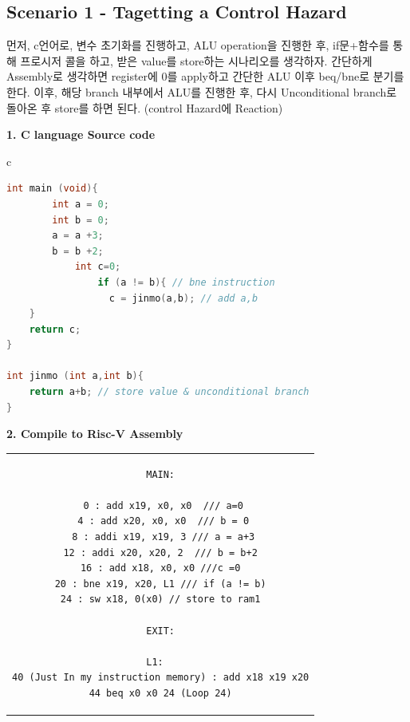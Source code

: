 \documentclass[oneside]{article}
\begin{document}
\subsection{Scenario 1 - Tagetting a Control Hazard}

먼저, c언어로, 변수 초기화를 진행하고, ALU operation을 진행한 후, if문+함수를 통해 프로시저 콜을 하고, 받은 value를 store하는 시나리오를 생각하자. 간단하게 Assembly로 생각하면 register에 0를 apply하고 간단한 ALU 이후 beq/bne로 분기를 한다. 이후, 해당 branch 내부에서 ALU를 진행한 후, 다시 Unconditional branch로 돌아온 후 store를 하면 된다.  (control Hazard에 Reaction)

\begin{center}
\textbf{1. C language Source code}
\end{center}
\begin{center}
\begin{tabular}{c}
\begin{lstlisting}[language=C]
int main (void){
        int a = 0;
        int b = 0;
        a = a +3;
        b = b +2;
            int c=0;
                if (a != b){ // bne instruction
                  c = jinmo(a,b); // add a,b
    }
    return c;
}

int jinmo (int a,int b){
    return a+b; // store value & unconditional branch
}
\end{lstlisting}
\end{tabular}
\end{center}

\begin{center}

\end{center}

\begin{center}
\textbf{2. Compile to Risc-V Assembly }
\end{center}

\begin{center}
\begin{tabular}{c}
\begin{lstlisting}[language={[RISC-V]Assembler}]
MAIN:

 0 : add x19, x0, x0  /// a=0
 4 : add x20, x0, x0  /// b = 0
 8 : addi x19, x19, 3 /// a = a+3
12 : addi x20, x20, 2  /// b = b+2
16 : add x18, x0, x0 ///c =0
20 : bne x19, x20, L1 /// if (a != b)
24 : sw x18, 0(x0) // store to ram1

EXIT:

L1:  
40 (Just In my instruction memory) : add x18 x19 x20
44 beq x0 x0 24 (Loop 24)

\end{lstlisting}
\end{tabular}
\end{center}
\end{document}
